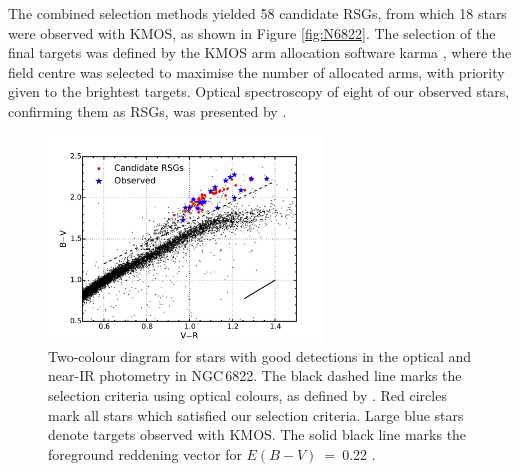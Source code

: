 The combined selection methods yielded 58 candidate RSGs, from which 18 stars were observed with KMOS, as shown in Figure
\ref{fig:N6822}.
The selection of the final targets was defined by the KMOS arm allocation software {\sc karma}
\citep{2008SPIE.7019E..0TW},
where the field centre was selected to maximise the number of allocated arms,
with priority given to the brightest targets.
Optical spectroscopy of eight of our observed stars, confirming them as RSGs, was presented by
\cite{2012AJ....144....2L}.


\begin{figure}
 \centering
 \includegraphics[width=0.65\textwidth]{ngc6822/N6822_bvr}
 \caption[$B-V$ against $V-R$ two colour diagram]{
          Two-colour diagram for stars with good detections in the optical and near-IR photometry in NGC\,6822.
          The black dashed line marks the selection criteria using optical colours, as defined by
          \protect\cite{2012AJ....144....2L}.
          Red circles mark all stars which satisfied our selection criteria.
          Large blue stars denote targets observed with KMOS.
          The solid black line marks the foreground reddening vector for $E(B-V)$~=~0.22
          \protect\citep{1998ApJ...500..525S}.
         }
 \label{fig:BVR}
\end{figure}

